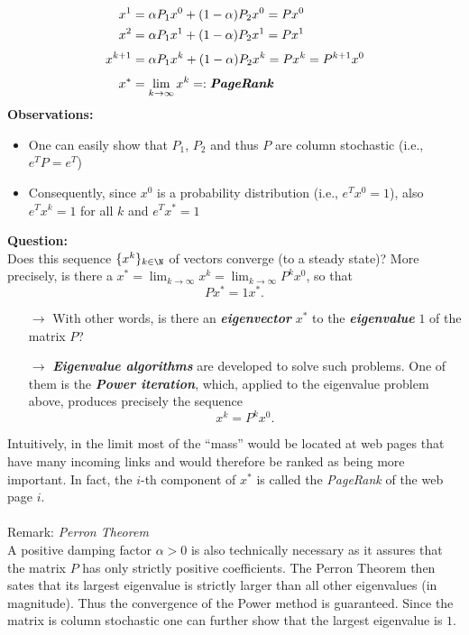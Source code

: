 {\begin{align*}
x^1 &=  \alpha P_1 x^0 + (1-\alpha) P_2 x^0 = Px^0  \\
x^2 &=  \alpha P_1 x^1 + (1-\alpha) P_2 x^1 = Px^1 \\[0.1cm]
x^{k+1} &=  \alpha P_1 x^k + (1-\alpha) P_2 x^k = Px^k = P^{k+1}x^0 \\[0.1cm]
x^* &=  \lim_{k\to \infty} x^k =: \textbf{\textit{PageRank}} 
\end{align*} 
\textbf{Observations:}
\begin{itemize}
	\item One can easily show that $P_1$, $P_2$ and thus $P$ are column stochastic (i.e., $e^TP = e^T$)
	\item Consequently, since $x^0$ is a probability distribution (i.e., $e^Tx^0 = 1$), also $e^Tx^k = 1$ for all $k$ and $e^Tx^*=1$
\end{itemize}

\textbf{Question:} \\
Does this sequence $\{x^k\}_{k \in \N}$ of vectors converge (to a steady state)? More precisely, is there a $x^* = \lim_{k\to \infty} x^k= \lim_{k\to \infty} P^kx^0$, so that
\begin{equation} \label{eq:PageRank_eigprob}
Px^* = 1 x^* .
\end{equation}
\begin{itemize}
	\item[$\rightarrow$] With other words, is there an \textit{\textbf{eigenvector}} $x^*$ to the \textit{\textbf{eigenvalue}} $1$ of the matrix $P$?
	\item[$\rightarrow$]\textit{\textbf{Eigenvalue algorithms}} are developed to solve such problems. One of them is the \textit{\textbf{Power iteration}}, which, applied to the eigenvalue problem above, produces precisely the sequence
	$$x^k = P^k x^0.$$
\end{itemize}
Intuitively, in the limit most of the ``mass'' would be located at web pages that have many incoming links and would therefore be ranked as being more important. In fact, the $i$-th component of $x^*$ is called the \textit{PageRank} of the web page $i$.\\~\\
Remark: \textit{Perron Theorem}\\
A positive damping factor $\alpha>0$ is also technically necessary as it assures that the matrix $P$ has only strictly positive coefficients. The Perron Theorem then sates that its largest eigenvalue is strictly larger than all other eigenvalues (in magnitude). Thus the convergence of the Power method is guaranteed. Since the matrix is column stochastic one can further show that the largest eigenvalue is $1$.
}